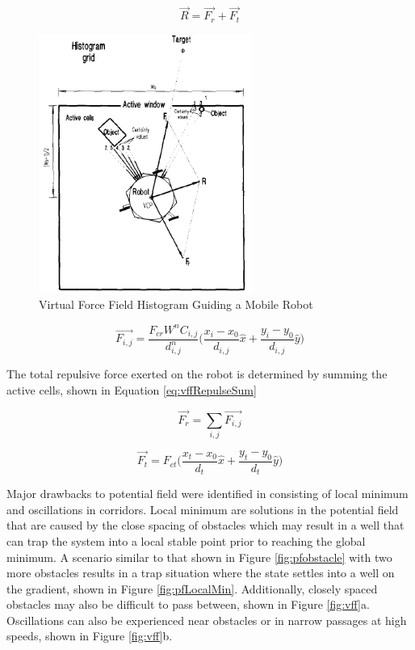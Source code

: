 \documentclass[numbered,pdftex]{ohio-etd}
\begin{document}
\begin{equation}\label{eq:vffHeading}
\overrightarrow{R} = \overrightarrow{F_r} + \overrightarrow{F_t}
\end{equation} 



\begin{figure}[H]
	\centering
	\includegraphics[width=7cm]{PaperFigures/histogram}
	\caption{Virtual Force Field Histogram Guiding a Mobile Robot \cite{borenstein_vector_1991}}
	\label{fig:histogram}
\end{figure}

\begin{equation}\label{eq:vffRepulse}
\overrightarrow{F_{i,j}} = \frac{F_{cr}W^nC_{i,j}}{d^n_{i,j}} \bigg( \frac{x_i-x_0}{d_{i,j}}\hat{x} + \frac{y_i-y_0}{d_{i,j}}\hat{y}\bigg)
\end{equation}

\noindent
The total repulsive force exerted on the robot is determined by summing the active cells, shown in Equation \ref{eq:vffRepulseSum}


\begin{equation}\label{eq:vffRepulseSum}
\overrightarrow{F_r} = \sum_{i,j}\overrightarrow{F_{i,j}}
\end{equation}


\begin{equation}\label{eq:vffGoal}
\overrightarrow{F_t} = F_{ct} \bigg( \frac{x_t-x_0}{d_{t}}\hat{x} + \frac{y_t-y_0}{d_{t}}\hat{y}\bigg)
\end{equation}


Major drawbacks to potential field were identified in \cite{koren_potential_1991} consisting of local minimum and oscillations in corridors. Local minimum are solutions in the potential field that are caused by the close spacing of obstacles which may result in a well that can trap the system into a local stable point prior to reaching the global minimum. A scenario similar to that shown in Figure \ref{fig:pfobstacle} with two more obstacles results in a trap situation where the state settles into a well on the gradient, shown in Figure \ref{fig:pfLocalMin}. Additionally, closely spaced obstacles may also be difficult to pass between, shown in Figure \ref{fig:vff}a. Oscillations can also be experienced near obstacles or in narrow passages at high speeds, shown in Figure \ref{fig:vff}b.
\end{document}
